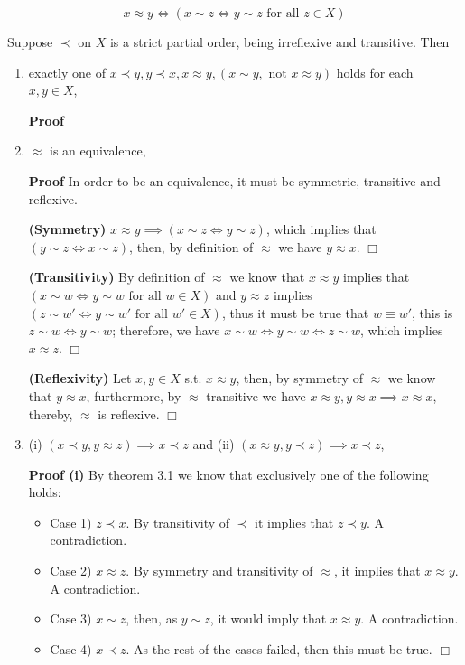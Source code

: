 \documentclass{article}
\theoremstyle{definition}
\def\tnot{\text{ not }}
\def\tforall{\text{ for all }}
\begin{document}
\begin{equation*}
x\approx y\iff (x\sim z\iff y\sim z\tforall z\in X)
\end{equation*}

 Suppose $\prec$ on $X$ is a strict partial order, being irreflexive and transitive. Then

\begin{enumerate}
\item exactly one of $x\prec y,y\prec x,x\approx y, (x\sim y,\tnot x\approx y)$ holds for each $x,y\in X$,

{\bf Proof} 

\item $\approx$ is an equivalence,

{\bf Proof} In order to be an equivalence, it must be symmetric, transitive and reflexive.

{\bf (Symmetry)} $x\approx y\implies (x\sim z\iff y\sim z)$, which implies that $(y\sim z\iff x\sim z)$, then, by definition of $\approx$ we have $y\approx x$. $\Box$

{\bf (Transitivity)} By definition of $\approx$ we know that $x\approx y$ implies that $(x\sim w\iff y\sim w\tforall w\in X)$ and $y\approx z$ implies $(z\sim w'\iff y\sim w'\tforall w'\in X)$, thus it must be true that $w\equiv w'$, this is $z\sim w\iff y\sim w$; therefore, we have $x\sim w\iff y\sim w \iff z\sim w$, which implies $x\approx z$. $\Box$

{\bf (Reflexivity)} Let $x,y \in X$ s.t. $x\approx y$, then, by symmetry of $\approx$ we know that $y\approx x$, furthermore, by $\approx$ transitive we have $x\approx y,y\approx x\implies x\approx x$, thereby, $\approx$ is reflexive. $\Box$


\item (i) $(x\prec y,y\approx z)\implies x\prec z$ and (ii) $(x\approx y,y\prec z)\implies x\prec z$,

{\bf Proof (i)} By theorem 3.1 we know that exclusively one of the following holds:

\begin{itemize}
\item[] Case 1) $z\prec x$. By transitivity of $\prec$ it implies that $z\prec y$. A contradiction.
\item[] Case 2) $x\approx z$. By symmetry and transitivity of $\approx$, it implies that $x\approx y$. A contradiction.
\item[] Case 3) $x\sim z$, then, as $y\sim z$, it would imply that $x\approx y$. A contradiction.
\item[] Case 4) $x\prec z$. As the rest of the cases failed, then this must be true. $\Box$
\end{itemize}


\end{enumerate}
\end{document}
